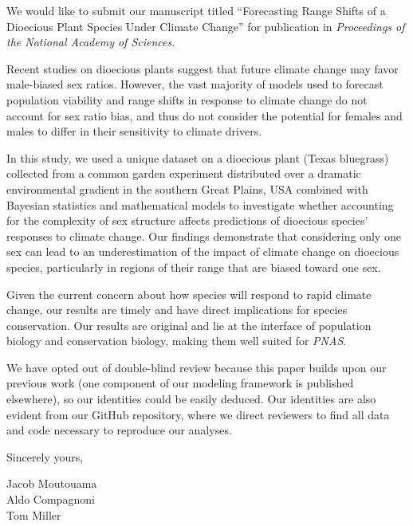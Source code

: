 \documentclass{article}
\begin{document}
We would like to submit our manuscript titled “Forecasting Range Shifts of a Dioecious Plant Species Under Climate Change” for publication in  \textit{
Proceedings of the National Academy of Sciences}.

Recent studies on dioecious plants suggest that future climate change may favor male-biased sex ratios. However, the vast majority of models used to forecast population viability and range shifts in response to climate change do not account for sex ratio bias, and thus do not consider the potential for females and males to differ in their sensitivity to climate drivers.

In this study, we  used a unique dataset on a dioecious plant (Texas bluegrass) collected from a common garden experiment distributed over a dramatic environmental gradient in the southern Great Plains, USA combined with Bayesian statistics and mathematical models to investigate whether accounting for the complexity of sex structure affects predictions of dioecious species’ responses to climate change. 
Our findings demonstrate that considering only one sex can lead to an underestimation of the impact of climate change on dioecious species, particularly in regions of their range that are biased toward one sex.

Given the current concern about how species will respond to rapid climate change, our results are timely and have direct implications for species conservation.
Our results are original and lie at the interface of population biology and conservation biology, making them well suited for \textit{PNAS}.

We have opted out of double-blind review because this paper builds upon our previous work (one component of our modeling framework is published elsewhere), so our identities could be easily deduced. Our identities are also evident from our GitHub repository, where we direct reviewers to find all data and code necessary to reproduce our analyses.

\bigskip %

Sincerely yours,

\vspace{20pt} %


Jacob Moutouama \\
Aldo Compagnoni \\
Tom Miller
\end{document}
